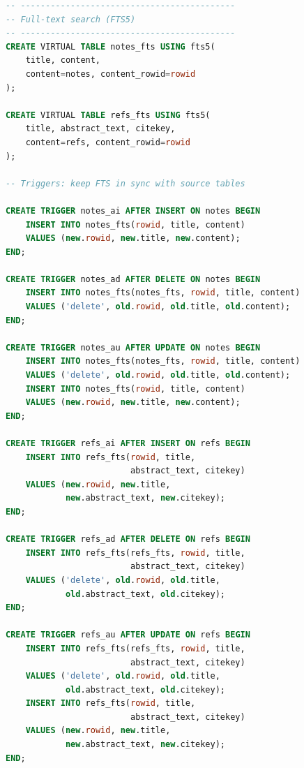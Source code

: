 \documentclass[11pt,a4paper]{article}
\begin{document}
\begin{lstlisting}[language=SQL, basicstyle=\ttfamily\footnotesize]
-- -------------------------------------------
-- Full-text search (FTS5)
-- -------------------------------------------
CREATE VIRTUAL TABLE notes_fts USING fts5(
    title, content,
    content=notes, content_rowid=rowid
);

CREATE VIRTUAL TABLE refs_fts USING fts5(
    title, abstract_text, citekey,
    content=refs, content_rowid=rowid
);

-- Triggers: keep FTS in sync with source tables

CREATE TRIGGER notes_ai AFTER INSERT ON notes BEGIN
    INSERT INTO notes_fts(rowid, title, content)
    VALUES (new.rowid, new.title, new.content);
END;

CREATE TRIGGER notes_ad AFTER DELETE ON notes BEGIN
    INSERT INTO notes_fts(notes_fts, rowid, title, content)
    VALUES ('delete', old.rowid, old.title, old.content);
END;

CREATE TRIGGER notes_au AFTER UPDATE ON notes BEGIN
    INSERT INTO notes_fts(notes_fts, rowid, title, content)
    VALUES ('delete', old.rowid, old.title, old.content);
    INSERT INTO notes_fts(rowid, title, content)
    VALUES (new.rowid, new.title, new.content);
END;

CREATE TRIGGER refs_ai AFTER INSERT ON refs BEGIN
    INSERT INTO refs_fts(rowid, title,
                         abstract_text, citekey)
    VALUES (new.rowid, new.title,
            new.abstract_text, new.citekey);
END;

CREATE TRIGGER refs_ad AFTER DELETE ON refs BEGIN
    INSERT INTO refs_fts(refs_fts, rowid, title,
                         abstract_text, citekey)
    VALUES ('delete', old.rowid, old.title,
            old.abstract_text, old.citekey);
END;

CREATE TRIGGER refs_au AFTER UPDATE ON refs BEGIN
    INSERT INTO refs_fts(refs_fts, rowid, title,
                         abstract_text, citekey)
    VALUES ('delete', old.rowid, old.title,
            old.abstract_text, old.citekey);
    INSERT INTO refs_fts(rowid, title,
                         abstract_text, citekey)
    VALUES (new.rowid, new.title,
            new.abstract_text, new.citekey);
END;
\end{lstlisting}
\end{document}
